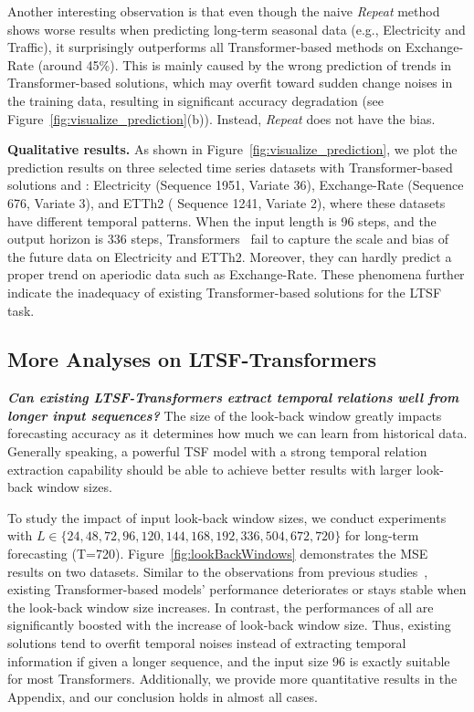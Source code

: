 Another interesting observation is that even though the naive \emph{Repeat} method shows worse results when predicting long-term seasonal data (e.g., Electricity and Traffic), it surprisingly outperforms all Transformer-based methods on Exchange-Rate (around 45\%). 
This is mainly caused by the wrong prediction of trends in Transformer-based solutions, which may overfit toward sudden change noises in the training data, resulting in significant accuracy degradation (see Figure~\ref{fig:visualize_prediction}(b)). Instead, \emph{Repeat} does not have the bias.


\textbf{Qualitative results.}
As shown in Figure~\ref{fig:visualize_prediction}, we plot the prediction results on three selected time series datasets with Transformer-based solutions and \modelname: Electricity (Sequence 1951, Variate 36), Exchange-Rate (Sequence 676, Variate 3), and ETTh2 ( Sequence 1241, Variate 2), where these datasets have different temporal patterns. When the input length is 96 steps, and the output horizon is 336 steps, Transformers~\cite{informer,xu2021autoformer,zhou2022fedformer} fail to capture the scale and bias of the future data on Electricity and ETTh2. Moreover, they can hardly predict a proper trend on aperiodic data such as Exchange-Rate. These phenomena further indicate the inadequacy of existing Transformer-based solutions for the LTSF task.



\subsection{More Analyses on LTSF-Transformers}
\label{subsec:TransformerModelDesign}

\textbf{\emph{Can existing LTSF-Transformers extract temporal relations well from longer input sequences?}}
The size of the look-back window greatly impacts forecasting accuracy as it determines how much we can learn from historical data. Generally speaking, a powerful TSF model with a strong temporal relation extraction capability should be able to achieve better results with larger look-back window sizes.
%

To study the impact of input look-back window sizes, we conduct experiments with $L \in \{24, 48, 72, 96, 120, 144, 168, 192, 336, 504, 672, 720\}$ for long-term forecasting (T=720).
%
Figure~\ref{fig:lookBackWindows} demonstrates the MSE results on two datasets. 
%
Similar to the observations from previous studies~\cite{informer,wen2022transformers}, existing Transformer-based models' performance deteriorates or stays stable when the look-back window size increases. In contrast, the performances of all \modelname are significantly boosted with the increase of look-back window size. 
Thus, existing solutions tend to overfit temporal noises instead of extracting temporal information if given a longer sequence, and the input size 96 is exactly suitable for most Transformers.
%
Additionally, we provide more quantitative results in the Appendix, and our conclusion holds in almost all cases. 


